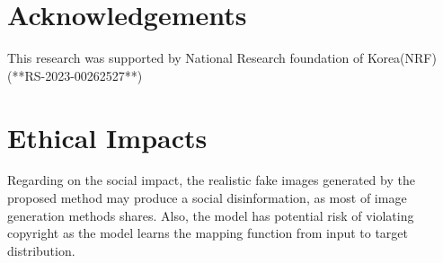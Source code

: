 \documentclass[letterpaper]{article} %
\begin{document}

\section{Acknowledgements}
This research was supported by National Research foundation of Korea(NRF) (**RS-2023-00262527**)

\section{Ethical Impacts}
Regarding on the social impact, the realistic fake images generated by the proposed method may produce a social disinformation, as most of image generation methods shares. Also, the model has potential risk of violating copyright as the model learns the mapping function from input to target distribution.



\end{document}
